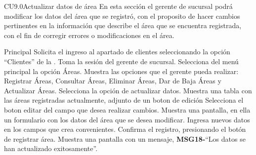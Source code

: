 

	\begin{UseCase}{CU9.0}{Actualizar datos de área}{
		En esta sección el gerente de sucursal podrá modificar los datos del área que se registró, con el proposito de hacer cambios pertinentes en la información que describe el área que se encuentra registrada, con el fin de corregir errores o modificaciones en el área. 
	}
	\end{UseCase}


	\begin{UCtrayectoria}{Principal}
		\UCpaso[\UCactor] Solicita el ingreso al apartado de clientes seleccionando la opción ``Clientes'' de la .
		\UCpaso Toma la sesión del gerente de sucursal.
		\UCpaso[\UCactor] Selecciona del menú principal la opción Áreas.
		\UCpaso Muestra las opciones que el gerente pueda realizar: Registrar Áreas, Consultar Áreas, Eliminar Áreas, Dar de Baja Áreas y Actualizar Áreas.
		\UCpaso[\UCactor] Selecciona la opción de actualizar datos.
		\UCpaso Muestra una tabla con las áreas registradas actualmente, adjunto de un boton de edición
		\UCpaso[\UCactor] Selecciona el boton editar del campo que desea realizar cambios.
		\UCpaso Muestra una pantalla, en ella un formulario con los datos del área que se desea modificar.
		\UCpaso[\UCactor] Ingresa nuevos datos en los campos que crea convenientes.  
		\UCpaso[\UCactor] Confirma el registro, presionando el botón de registrar área.
		\UCpaso Muestra una pantalla con un mensaje, {\bf MSG18-}``Los datos se han actualizado exitosamente''.
	\end{UCtrayectoria}

